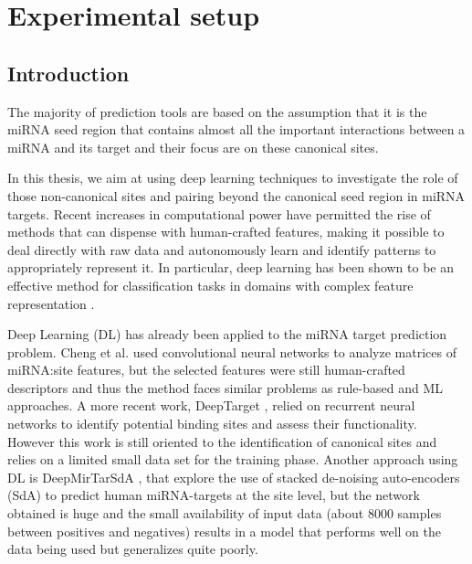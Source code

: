 
\chapter{Experimental setup} %

\label{Chapter3} %



\section{Introduction}
The majority of prediction tools are based on the assumption that it is the miRNA seed region that contains almost all the important interactions between a miRNA and its target and their focus are on these canonical sites.

In this thesis, we aim at using deep learning techniques to investigate the role of those non-canonical sites and pairing beyond the canonical seed region in miRNA targets. Recent increases in computational power have permitted the rise of methods that can dispense with human-crafted features, making it possible to deal directly with raw data and autonomously learn and identify patterns to appropriately represent it. In particular, deep learning has been shown to be an effective method for classification tasks in domains with complex feature representation \cite{dl}.

Deep Learning (DL) has already been applied to the miRNA target prediction problem. Cheng et al. \cite{mirtdl} used convolutional neural networks to analyze matrices of miRNA:site features, but the selected features were still human-crafted descriptors and thus the method faces similar problems as rule-based and ML approaches. A more recent work, DeepTarget \cite{deep_target}, relied on recurrent neural networks to identify potential binding sites and assess their functionality. However this work is still oriented to the identification of canonical sites and relies on a limited small data set for the training phase. Another approach using DL is DeepMirTarSdA \cite{deep_mirtar}, that explore the use of stacked de-noising auto-encoders (SdA) to predict human miRNA-targets at the site level, but the network obtained is huge and the small availability of input data (about 8000 samples between positives and negatives) results in a model that performs well on the data being used but generalizes quite poorly. 

